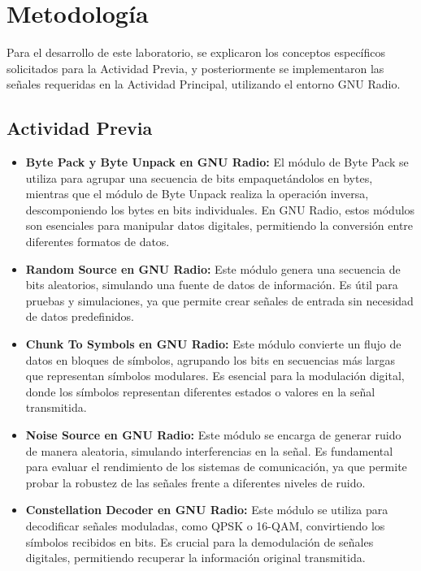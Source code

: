 \documentclass[12pt]{article}
\begin{document}
\section{Metodología}
Para el desarrollo de este laboratorio, se explicaron los conceptos específicos solicitados para la Actividad Previa, y posteriormente se implementaron las señales requeridas en la Actividad Principal, utilizando el entorno GNU Radio.  

\subsection{Actividad Previa}

\begin{itemize}
    \item \textbf{Byte Pack y Byte Unpack en GNU Radio:} El módulo de Byte Pack se utiliza para agrupar una secuencia de bits empaquetándolos en bytes, mientras que el módulo de Byte Unpack realiza la operación inversa, descomponiendo los bytes en bits individuales. En GNU Radio, estos módulos son esenciales para manipular datos digitales, permitiendo la conversión entre diferentes formatos de datos.
    
    \item \textbf{Random Source en GNU Radio:} Este módulo genera una secuencia de bits aleatorios, simulando una fuente de datos de información. Es útil para pruebas y simulaciones, ya que permite crear señales de entrada sin necesidad de datos predefinidos.
    
    \item \textbf{Chunk To Symbols en GNU Radio:} Este módulo convierte un flujo de datos en bloques de símbolos, agrupando los bits en secuencias más largas que representan símbolos modulares. Es esencial para la modulación digital, donde los símbolos representan diferentes estados o valores en la señal transmitida.
    
    \item \textbf{Noise Source en GNU Radio:} Este módulo se encarga de generar ruido de manera aleatoria, simulando interferencias en la señal. Es fundamental para evaluar el rendimiento de los sistemas de comunicación, ya que permite probar la robustez de las señales frente a diferentes niveles de ruido.
    
    \item \textbf{Constellation Decoder en GNU Radio:} Este módulo se utiliza para decodificar señales moduladas, como QPSK o 16-QAM, convirtiendo los símbolos recibidos en bits. Es crucial para la demodulación de señales digitales, permitiendo recuperar la información original transmitida.
    

\end{itemize}
\end{document}
